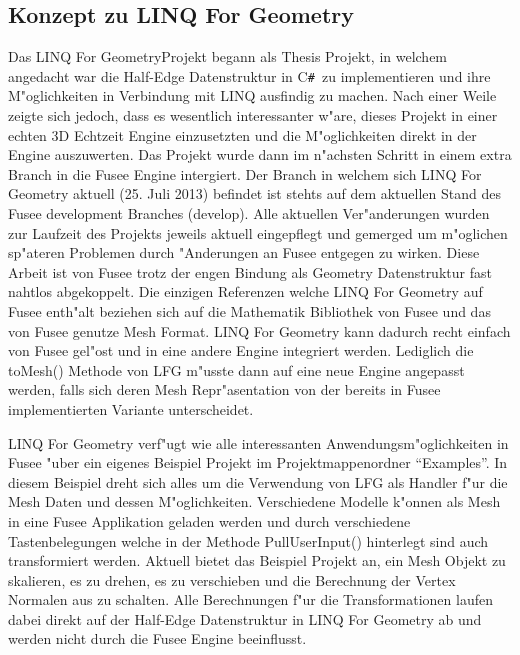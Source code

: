 \documentclass[pagesize, paper=a4, fontsize=12pt,titlepage=true, headings=small, headnosepline, abstractoff, liststotoc, nochapterprefix, plainheadsepline]{scrreprt}
\newcommand{\CSS}{C\texttt{\# }}
\newcommand{\LFG}{LINQ For Geometry}
\newcommand{\LFGS}{LINQ For Geometry }
\newcommand{\HES}{Half-Edge Datenstruktur }
\begin{document}
		\subsection {Konzept zu \LFG}
			Das \LFG Projekt begann als Thesis Projekt, in welchem angedacht war die \HES in \CSS zu implementieren und ihre M"oglichkeiten in Verbindung mit LINQ ausfindig zu machen. Nach einer Weile zeigte sich jedoch, dass es wesentlich interessanter w"are, dieses Projekt in einer echten 3D Echtzeit Engine einzusetzten und die M"oglichkeiten direkt in der Engine auszuwerten. Das Projekt wurde dann im n"achsten Schritt in einem extra Branch in die Fusee Engine intergiert. Der Branch in welchem sich \LFGS aktuell (25. Juli 2013) befindet ist stehts auf dem aktuellen Stand des Fusee development Branches (develop). Alle aktuellen Ver"anderungen wurden zur Laufzeit des Projekts jeweils aktuell eingepflegt und gemerged um m"oglichen sp"ateren Problemen durch "Anderungen an Fusee entgegen zu wirken. Diese Arbeit ist von Fusee trotz der engen Bindung als Geometry Datenstruktur fast nahtlos abgekoppelt. Die einzigen Referenzen welche \LFGS auf Fusee enth"alt beziehen sich auf die Mathematik Bibliothek von Fusee und das von Fusee genutze Mesh Format. \LFGS kann dadurch recht einfach von Fusee gel"ost und in eine andere Engine integriert werden. Lediglich die toMesh() Methode von LFG m"usste dann auf eine neue Engine angepasst werden, falls sich deren Mesh Repr"asentation von der bereits in Fusee implementierten Variante unterscheidet.
\newline

\LFGS verf"ugt wie alle interessanten Anwendungsm"oglichkeiten in Fusee "uber ein eigenes Beispiel Projekt im Projektmappenordner "`Examples"'. In diesem Beispiel dreht sich alles um die Verwendung von LFG als Handler f"ur die Mesh Daten und dessen M"oglichkeiten. Verschiedene Modelle k"onnen als Mesh in eine Fusee Applikation geladen werden und durch verschiedene Tastenbelegungen welche in der Methode  PullUserInput() hinterlegt sind auch transformiert werden. Aktuell bietet das Beispiel Projekt an, ein Mesh Objekt zu skalieren, es zu drehen, es zu verschieben und die Berechnung der Vertex Normalen aus zu schalten. Alle Berechnungen f"ur die Transformationen laufen dabei direkt auf der \HES in \LFGS ab und werden nicht durch die Fusee Engine beeinflusst.
\newline
\end{document}
